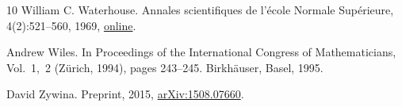 \documentclass[12pt]{amsart}
\numberwithin{equation}{section}
\theoremstyle{definition}
\begin{document}
\begin{thebibliography}{10}
William C. Waterhouse.
\newblock Annales scientifiques de l'\'ecole Normale Sup\'erieure, 4(2):521--560, 1969,
\newblock \href{http://www.numdam.org/item/ASENS_1969_4_2_4_521_0/}{online}.

Andrew Wiles.
\newblock In Proceedings of the International Congress of Mathematicians, Vol.~1,~2 (Zürich, 1994), pages 243--245. Birkhäuser, Basel, 1995.

David Zywina.
 Preprint, 2015,
\newblock \href{https://arxiv.org/abs/1508.07660}{arXiv:1508.07660}.
\end{thebibliography}
\end{document}
